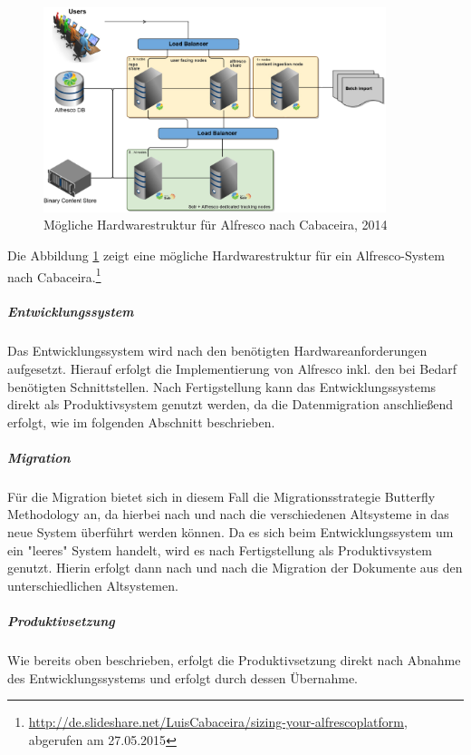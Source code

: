 \begin{figure}[h!]
	\centering
	\includegraphics[width=10cm]{kapitel/gruppe4_1/bilder/deployment_diagramm_alfresco}
	\caption{Mögliche Hardwarestruktur für Alfresco nach Cabaceira, 2014}
	\label{fig_deployment_alfresco}
\end{figure}

Die Abbildung \ref{fig_deployment_alfresco} zeigt eine mögliche Hardwarestruktur für ein Alfresco-System nach Cabaceira.\footnote{\url{http://de.slideshare.net/LuisCabaceira/sizing-your-alfrescoplatform}, abgerufen am 27.05.2015}

\subparagraph{Entwicklungssystem}
Das Entwicklungssystem wird nach den benötigten Hardwareanforderungen aufgesetzt. Hierauf erfolgt die Implementierung von Alfresco inkl. den bei Bedarf benötigten Schnittstellen. Nach Fertigstellung kann das Entwicklungssystems direkt als Produktivsystem genutzt werden, da die Datenmigration anschließend erfolgt, wie im folgenden Abschnitt beschrieben.

\subparagraph{Migration}
Für die Migration bietet sich in diesem Fall die Migrationsstrategie Butterfly Methodology an, da hierbei nach und nach die verschiedenen Altsysteme in das neue System überführt werden können. Da es sich beim Entwicklungssystem um ein "leeres" System handelt, wird es nach Fertigstellung als Produktivsystem genutzt. Hierin erfolgt dann nach und nach die Migration der Dokumente aus den unterschiedlichen Altsystemen.

\subparagraph{Produktivsetzung}
Wie bereits oben beschrieben, erfolgt die Produktivsetzung direkt nach Abnahme des Entwicklungssystems und erfolgt durch dessen Übernahme.

